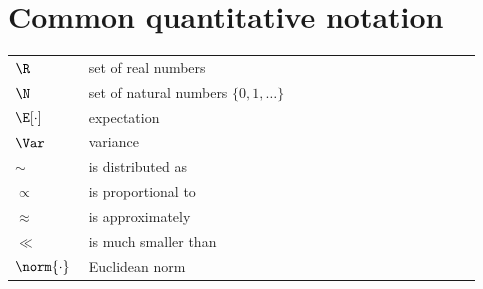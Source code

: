 \section{Common quantitative notation}
\noindent
\begin{longtable}{p{0.15\linewidth} p{0.80\linewidth}}
    $\R$            & set of real numbers                                  \\
    $\N$            & set of natural numbers $\{0, 1, \dots\}$             \\
    $\E[\cdot]$     & expectation                                          \\
    $\Var$          & variance                                             \\
    $\sim$          & is distributed as                                    \\
    $\propto$       & is proportional to                                   \\
    $\approx$       & is approximately                                     \\
    $\ll$           & is much smaller than                                 \\
    $\norm{\cdot}$  & Euclidean norm                                       \\
\end{longtable}
\clearpage
